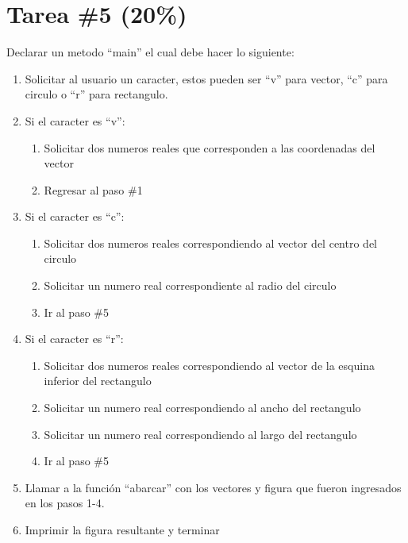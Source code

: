 \documentclass{article}
\begin{document}
\section*{Tarea \#5 (20\%)}
Declarar un metodo ``main'' el cual debe hacer lo siguiente:
\begin{enumerate}
        \item{Solicitar al usuario un caracter, estos pueden ser ``v'' para vector, ``c'' para circulo
        o ``r'' para rectangulo.}
        \item{Si el caracter es ``v'':
                \begin{enumerate}
                        \item{Solicitar dos numeros reales que corresponden a las coordenadas
                        del vector}
                        \item{Regresar al paso \#1}
                \end{enumerate}
        }
        \item{Si el caracter es ``c'':
                \begin{enumerate}
                        \item{Solicitar dos numeros reales correspondiendo al vector del centro del circulo}
                        \item{Solicitar un numero real correspondiente al radio del circulo}
                        \item{Ir al paso \#5}
                \end{enumerate}
        }
        \item{Si el caracter es ``r'':
                \begin{enumerate}
                        \item{Solicitar dos numeros reales correspondiendo al vector de la esquina inferior del
                        rectangulo}
                        \item{Solicitar un numero real correspondiendo al ancho del rectangulo}
                        \item{Solicitar un numero real correspondiendo al largo del rectangulo}
                        \item{Ir al paso \#5}
                \end{enumerate}
        }
        \item{Llamar a la funci\'on ``abarcar'' con los vectores y figura que fueron ingresados en los pasos 1-4.}
        \item{Imprimir la figura resultante y terminar}
\end{enumerate}
\end{document}

